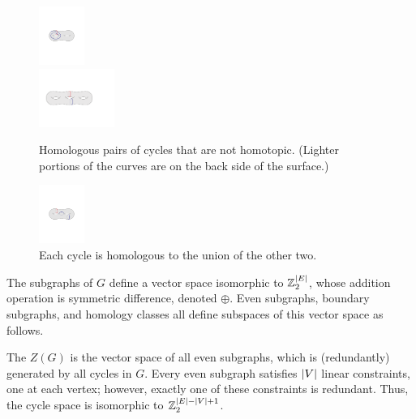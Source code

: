 \documentclass{sig-alternate}
\def\note#1{\EMPH{\color{red} #1}}
\def\Z{\mathbb{Z}}
\begin{document}


\begin{figure}[htb]
\centering
\includegraphics[height=0.75in]{Fig/homologous3}\\[2ex]
\includegraphics[height=0.75in]{Fig/homologous2}
\caption{Homologous pairs of cycles that are not homotopic.  (Lighter portions of the curves are on the back side of the surface.)}
\label{F:homology}
\end{figure}

\begin{figure}[htb]
\centering
\includegraphics[height=0.75in]{Fig/homologous1}
\caption{Each cycle is homologous to the union of the other two.}
\label{F:homology2}
\end{figure}



The subgraphs of $G$ define a vector space isomorphic to $\Z_2^{\abs{E}}$, whose addition operation is symmetric difference, denoted $\oplus$.  Even subgraphs, boundary subgraphs, and homology classes all define subspaces of this vector space as follows.

The  $Z(G)$ is the vector space of all even subgraphs, which is (redundantly) generated by all cycles in $G$.  Every even subgraph satisfies $\mathopen| V \mathclose|$ linear constraints, one at each vertex; however, exactly one of these constraints is redundant.  Thus, the cycle space is isomorphic to $\Z_2^{\abs{E}-\abs{V}+1}$.
\end{document}
